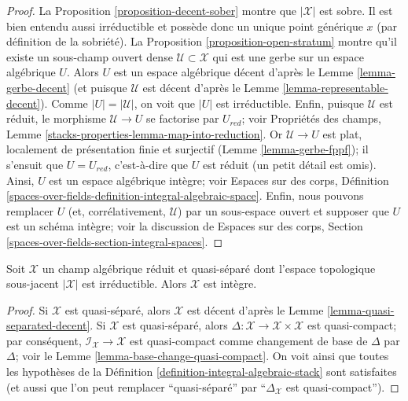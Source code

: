 \begin{proof}
La Proposition \ref{proposition-decent-sober} montre que $|\mathcal{X}|$
est sobre. Il est bien entendu aussi irr\'eductible et poss\`ede donc un unique
point g\'en\'erique $x$ (par d\'efinition de la sobri\'et\'e).
La Proposition \ref{proposition-open-stratum} montre
qu'il existe un sous-champ ouvert dense $\mathcal{U} \subset \mathcal{X}$
qui est une gerbe sur un espace alg\'ebrique $U$.
Alors $U$ est un espace alg\'ebrique d\'ecent d'apr\`es le
Lemme \ref{lemma-gerbe-decent} (et puisque $\mathcal{U}$
est d\'ecent d'apr\`es le Lemme \ref{lemma-representable-decent}).
Comme $|U| = |\mathcal{U}|$, on voit que $|U|$ est irr\'eductible.
Enfin, puisque $\mathcal{U}$ est r\'eduit, le morphisme
$\mathcal{U} \to U$ se factorise par $U_{red}$; voir
Propri\'et\'es des champs, Lemme \ref{stacks-properties-lemma-map-into-reduction}.
Or $\mathcal{U} \to U$ est plat, localement de pr\'esentation finie
et surjectif (Lemme \ref{lemma-gerbe-fppf}); il s'ensuit que
$U = U_{red}$, c'est-\`a-dire que $U$ est r\'eduit (un petit d\'etail est omis).
Ainsi, $U$ est un espace alg\'ebrique int\`egre; voir
Espaces sur des corps, D\'efinition
\ref{spaces-over-fields-definition-integral-algebraic-space}.
Enfin, nous pouvons remplacer $U$ (et, corr\'elativement, $\mathcal{U}$)
par un sous-espace ouvert et supposer que $U$ est un sch\'ema int\`egre; voir
la discussion de Espaces sur des corps, Section
\ref{spaces-over-fields-section-integral-spaces}.
\end{proof}

\begin{lemma}
\label{lemma-totaro-case}
Soit $\mathcal{X}$ un champ alg\'ebrique r\'eduit et quasi-s\'epar\'e
dont l'espace topologique sous-jacent $|\mathcal{X}|$ est irr\'eductible.
Alors $\mathcal{X}$ est int\`egre.
\end{lemma}

\begin{proof}
Si $\mathcal{X}$ est quasi-s\'epar\'e, alors $\mathcal{X}$ est d\'ecent
d'apr\`es le Lemme \ref{lemma-quasi-separated-decent}.
Si $\mathcal{X}$ est quasi-s\'epar\'e, alors
$\Delta : \mathcal{X} \to \mathcal{X} \times \mathcal{X}$ est quasi-compact;
par cons\'equent, $\mathcal{I}_\mathcal{X} \to \mathcal{X}$ est quasi-compact
comme changement de base de $\Delta$ par $\Delta$; voir le
Lemme \ref{lemma-base-change-quasi-compact}.
On voit ainsi que toutes les hypoth\`eses de la
D\'efinition \ref{definition-integral-algebraic-stack} sont satisfaites
(et aussi que l'on peut remplacer ``quasi-s\'epar\'e'' par
``$\Delta_\mathcal{X}$ est quasi-compact'').
\end{proof}

